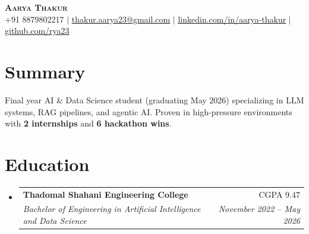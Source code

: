 \documentclass[letterpaper,11pt]{article}
\makeatletter
\newcommand{\resumeItem}[1]{
  \item\normalsize{
    {#1 \vspace{-2pt}}
  }
}
\newcommand{\resumeSubheading}[4]{
  \vspace{-2pt}\item
    \begin{tabular*}{0.97\textwidth}[t]{l@{\extracolsep{\fill}}r}
      \textbf{#1} & #2 \\
      \textit{\normalsize#3} & \textit{\normalsize #4} \\
    \end{tabular*}\vspace{-7pt}
}
\newcommand{\resumeSubHeadingListStart}{\begin{itemize}[leftmargin=0.15in, label={}]}
\newcommand{\resumeSubHeadingListEnd}{\end{itemize}}
\makeatother
\begin{document}
\begin{center}
    \textbf{\Huge \scshape Aarya Thakur} \\ \vspace{1pt}
    \small +91 8879802217 $|$ \href{mailto:thakur.aarya23@gmail.com}{\underline{thakur.aarya23@gmail.com}} $|$ 
    \href{https://linkedin.com/in/aarya-thakur}{\underline{linkedin.com/in/aarya-thakur}} $|$
    \href{https://github.com/rya23}{\underline{github.com/rya23}}
\end{center}


\section{Summary}
   \small{Final year AI \& Data Science student (graduating May 2026) specializing in LLM systems, RAG pipelines, and agentic AI. Proven in high-pressure environments with \textbf{2 internships} and \textbf{6 hackathon wins}.}  

\section{Education}
  \resumeSubHeadingListStart
    \resumeSubheading
      {Thadomal Shahani Engineering College}{CGPA 9.47}
      {Bachelor of Engineering in Artificial Intelligence and Data Science}{November 2022 -- May 2026}
  \resumeSubHeadingListEnd


\end{document}
